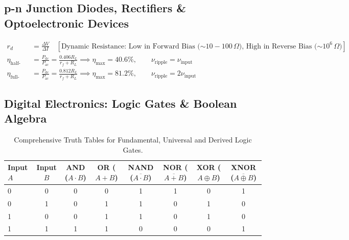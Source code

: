 \documentclass[11pt,a4paper]{article}
\begin{document}
\subsection{p-n Junction Diodes, Rectifiers \& Optoelectronic Devices}

\begin{formulabox}
\begin{align}
  r_d &= \frac{\Delta V}{\Delta I} \quad [\text{Dynamic Resistance: Low in Forward Bias ($\sim 10-100\,\Omega$), High in Reverse Bias ($\sim 10^6\,\Omega$)}] \\
  \eta_{\text{half-wave}} &= \frac{P_{\text{dc}}}{P_{\text{ac}}} = \frac{0.406 R_L}{r_f + R_L} \implies \eta_{\max} = 40.6\%, \qquad \nu_{\text{ripple}} = \nu_{\text{input}} \\
  \eta_{\text{full-wave}} &= \frac{P_{\text{dc}}}{P_{\text{ac}}} = \frac{0.812 R_L}{r_f + R_L} \implies \eta_{\max} = 81.2\%, \qquad \nu_{\text{ripple}} = 2\nu_{\text{input}}
\end{align}
\end{formulabox}

\subsection{Digital Electronics: Logic Gates \& Boolean Algebra}

\begin{table}[htbp]
\centering
\small
\renewcommand{\arraystretch}{1.2}
\begin{tabularx}{\textwidth}{l c c c c c c c}
\toprule
\textbf{Input $A$} & \textbf{Input $B$} & \textbf{AND ($A\cdot B$)} & \textbf{OR ($A+B$)} & \textbf{NAND ($\overline{A\cdot B}$)} & \textbf{NOR ($\overline{A+B}$)} & \textbf{XOR ($A\oplus B$)} & \textbf{XNOR ($\overline{A\oplus B}$)} \\
\midrule
0 & 0 & 0 & 0 & 1 & 1 & 0 & 1 \\
0 & 1 & 0 & 1 & 1 & 0 & 1 & 0 \\
1 & 0 & 0 & 1 & 1 & 0 & 1 & 0 \\
1 & 1 & 1 & 1 & 0 & 0 & 0 & 1 \\
\bottomrule
\end{tabularx}
\caption{Comprehensive Truth Tables for Fundamental, Universal and Derived Logic Gates.}
\end{table}
\end{document}
